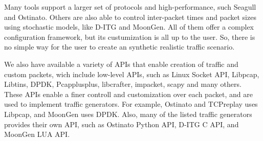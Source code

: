 Many tools support a larger set of protocols and high-performance, such Seagull and Ostinato. Others are also able to control inter-packet times and packet sizes using stochastic models, like D-ITG\cite{ditg-paper} and MoonGen. All of them offer a complex configuration framework, but its custumization is all up to the user. So, there is no simple way for the user to create an synthetic realistic traffic scenario. 

We also have available a variety of APIs that enable creation of traffic and custom packets, wich include low-level APIs, such as Linux Socket API,  Libpcap, Libtins, DPDK, Pcapplusplus, libcrafter, impacket, scapy and many others. These APIs enable a finer controll and customization over each packet, and are used to implement traffic generators. For example, Ostinato and TCPreplay uses Libpcap, and MoonGen uses DPDK. Also, many of the listed traffic generators provides their own API, such as Ostinato Python API, D-ITG C API, and MoonGen LUA API. 




